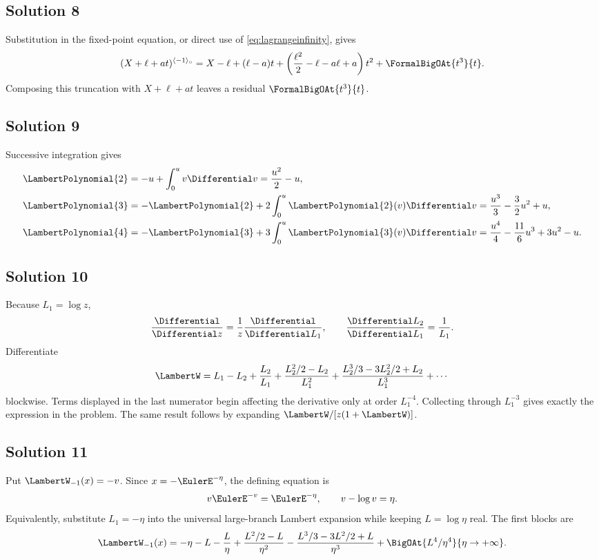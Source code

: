 \documentclass[11pt,oneside,openany]{book}
\newcommand{\rev}{^{\langle-1\rangle_{\circ}}}
\begin{document}
\subsection*{Solution 8}
Substitution in the fixed-point equation, or direct use of
\cref{eq:lagrangeinfinity}, gives
\[
 (X+\ell+at)\rev
 =X-\ell+(\ell-a)t
 +\left(\frac{\ell^2}{2}-\ell-a\ell+a\right)t^2
 +\FormalBigOAt{t^3}{t}.
\]
Composing this truncation with \(X+\ell+at\) leaves a residual
\(\FormalBigOAt{t^3}{t}\).

\subsection*{Solution 9}
Successive integration gives
\begin{align*}
 \LambertPolynomial{2}&=-u+\int_0^u v\Differential v=\frac{u^2}{2}-u,\\
 \LambertPolynomial{3}&=-\LambertPolynomial{2}+2\int_0^u\LambertPolynomial{2}(v)\Differential v
 =\frac{u^3}{3}-\frac32u^2+u,\\
 \LambertPolynomial{4}&=-\LambertPolynomial{3}+3\int_0^u\LambertPolynomial{3}(v)\Differential v
 =\frac{u^4}{4}-\frac{11}{6}u^3+3u^2-u.
\end{align*}

\subsection*{Solution 10}
Because \(L_1=\log z\),
\[
 \frac{\Differential}{\Differential z}=\frac1z\frac{\Differential}{\Differential L_1},
 \qquad
 \frac{\Differential L_2}{\Differential L_1}=\frac1{L_1}.
\]
Differentiate
\[
 \LambertW=L_1-L_2+\frac{L_2}{L_1}
 +\frac{L_2^2/2-L_2}{L_1^2}
 +\frac{L_2^3/3-3L_2^2/2+L_2}{L_1^3}+\cdots
\]
blockwise.  Terms displayed in the last numerator begin affecting the
derivative only at order \(L_1^{-4}\).  Collecting through
\(L_1^{-3}\) gives exactly the expression in the problem.  The same result
follows by expanding \(\LambertW/[z(1+\LambertW)]\).

\subsection*{Solution 11}
Put \(\LambertW_{-1}(x)=-v\).  Since \(x=-\EulerE^{-\eta}\), the defining equation is
\[
 v\EulerE^{-v}=\EulerE^{-\eta},
 \qquad v-\log v=\eta.
\]
Equivalently, substitute \(L_1=-\eta\) into the universal large-branch
Lambert expansion while keeping \(L=\log\eta\) real.  The first blocks are
\[
 \LambertW_{-1}(x)
 =-\eta-L-\frac{L}{\eta}
 +\frac{L^2/2-L}{\eta^2}
 -\frac{L^3/3-3L^2/2+L}{\eta^3}
 +\BigOAt{L^4/\eta^4}{\eta\to+\infty}.
\]
\end{document}

